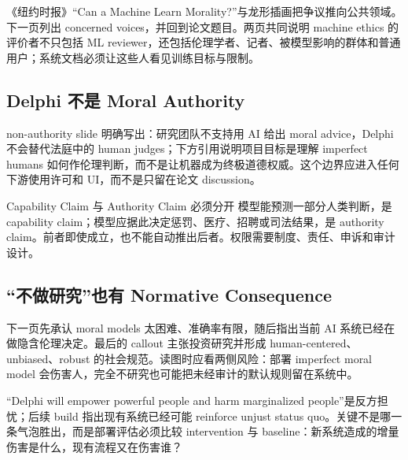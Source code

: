 《纽约时报》“Can a Machine Learn Morality?”与龙形插画把争议推向公共领域。下一页列出 concerned voices，并回到论文题目。两页共同说明 machine ethics 的评价者不只包括 ML reviewer，还包括伦理学者、记者、被模型影响的群体和普通用户；系统文档必须让这些人看见训练目标与限制。



\subsection{Delphi 不是 Moral Authority}

non-authority slide 明确写出：研究团队不支持用 AI 给出 moral advice，Delphi 不会替代法庭中的 human judges；下方引用说明项目目标是理解 imperfect humans 如何作伦理判断，而不是让机器成为终极道德权威。这个边界应进入任何下游使用许可和 UI，而不是只留在论文 discussion。


\begin{importantbox}{Capability Claim 与 Authority Claim 必须分开}
模型能预测一部分人类判断，是 capability claim；模型应据此决定惩罚、医疗、招聘或司法结果，是 authority claim。前者即使成立，也不能自动推出后者。权限需要制度、责任、申诉和审计设计。
\end{importantbox}

\subsection{“不做研究”也有 Normative Consequence}

下一页先承认 moral models 太困难、准确率有限，随后指出当前 AI 系统已经在做隐含伦理决定。最后的 callout 主张投资研究并形成 human-centered、unbiased、robust 的社会规范。读图时应看两侧风险：部署 imperfect moral model 会伤害人，完全不研究也可能把未经审计的默认规则留在系统中。


“Delphi will empower powerful people and harm marginalized people”是反方担忧；后续 build 指出现有系统已经可能 reinforce unjust status quo。关键不是哪一条气泡胜出，而是部署评估必须比较 intervention 与 baseline：新系统造成的增量伤害是什么，现有流程又在伤害谁？


